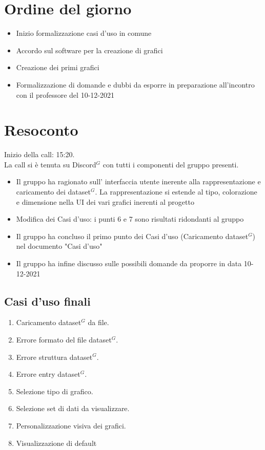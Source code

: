 \section{Ordine del giorno}

\begin{itemize}
	\item Inizio formalizzazione casi d'uso in comune
	\item Accordo sul software per la creazione di grafici
	\item Creazione dei primi grafici
	\item Formalizzazione di domande e dubbi da esporre in preparazione all'incontro con il professore del 10-12-2021
\end{itemize}

\section{Resoconto}

\noindent 
Inizio della call: 15:20. \\
\noindent La call si è tenuta su Discord$^{G}$ con tutti i componenti del gruppo presenti.
\begin{itemize}
	\item Il gruppo ha ragionato sull' interfaccia utente inerente alla rappresentazione e caricamento dei dataset$^{G}$. La rappresentazione si estende al tipo, colorazione e dimensione nella UI dei vari grafici inerenti al progetto
	\item Modifica dei Casi d'uso: i punti 6 e 7 sono risultati ridondanti al gruppo
	\item Il gruppo ha concluso il primo punto dei Casi d'uso (Caricamento dataset$^{G}$) nel documento "Casi d'uso"
	\item Il gruppo ha infine discusso sulle possibili domande da proporre in data 10-12-2021
\end{itemize}

\subsection{Casi d'uso finali}
\begin{enumerate}
	\item Caricamento dataset$^{G}$ da file.
	\item Errore formato del file dataset$^{G}$.
	\item Errore struttura dataset$^{G}$.
	\item Errore entry dataset$^{G}$.
	\item Selezione tipo di grafico.
	\item Selezione set di dati da visualizzare.
	\item Personalizzazione visiva dei grafici.
	\item Visualizzazione di default
\end{enumerate}

